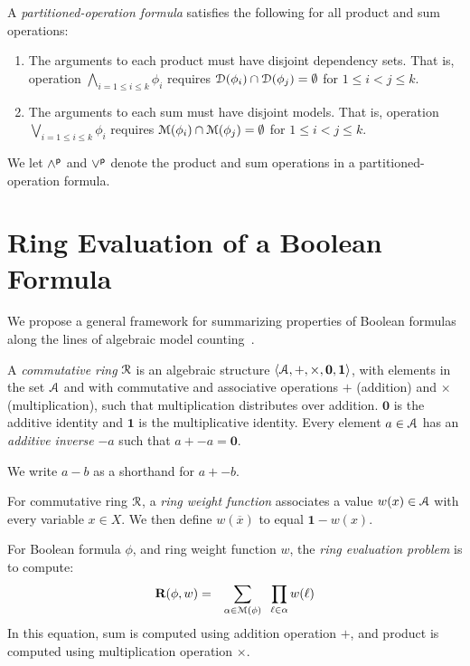 \documentclass[letterpaper,USenglish,cleveref, autoref, thm-restate]{lipics-v2021}
\newcommand{\pand}{\mathbin{\land^{\sf p}}}
\newcommand{\por}{\mathbin{\lor^{\sf p}}}
\newcommand{\obar}[1]{\overline{#1}}
\newcommand{\lit}{\ell}
\newcommand{\varset}{X}
\newcommand{\dependencyset}{{\cal D}}
\newcommand{\ring}{{\cal R}}
\newcommand{\dset}{{\cal A}}
\newcommand{\rep}{\textbf{R}}
\newcommand{\radd}{+}
\newcommand{\rmul}{\times}
\newcommand{\addident}{\textbf{0}}
\newcommand{\mulident}{\textbf{1}}
\newcommand{\modelset}{{\cal M}}
\begin{document}
\begin{definition}\label{def:partitioned-operation-formula}
  A {\em partitioned-operation formula}
 satisfies the following for all product and sum operations:
      \begin{enumerate}
      \item The arguments to each product must have disjoint dependency sets.  That is, operation
        $\bigwedge_{i=1 \leq i \leq k} \phi_i$ requires $\dependencyset(\phi_i) \cap \dependencyset(\phi_j) = \emptyset$ for $1 \leq i < j \leq k$.
      \item The arguments to each sum must have disjoint models.  That is, operation
        $\bigvee_{i=1 \leq i \leq k} \phi_i$ requires $\modelset(\phi_i) \cap \modelset(\phi_j) = \emptyset$ for $1 \leq i < j \leq k$.
      \end{enumerate}
\end{definition}
     We let $\pand$ and $\por$ denote the product and sum operations in a partitioned-operation formula.

  \section{Ring Evaluation of a Boolean Formula}

We propose a general framework for summarizing properties of Boolean
formulas along the lines of algebraic model counting~\cite{kimmig:jal:2017}.

\begin{definition}
  A {\em commutative ring} $\ring$ is an algebraic structure
  $\langle \dset, \radd, \rmul, \addident, \mulident \rangle$,
  with elements in the set $\dset$ and with commutative and
  associative operations $\radd$ (addition) and $\rmul$ (multiplication),
  such that multiplication distributes
  over addition.  $\addident$ is the additive identity and $\mulident$ is
  the multiplicative identity.  Every element $a \in \dset$ has an
  {\em additive inverse} $-a$ such that $a + -a = \addident$.
\label{def:ring}
\end{definition}
We write $a - b$ as a shorthand for $a + -b$.

\begin{definition}
\label{def:ring_evaluation}
  For commutative ring $\ring$, a {\em ring weight function} associates a value $w(x) \in \dset$ with
  every variable $x \in \varset$.  We then define $w(\obar{x})$ to equal $\mulident-w(x)$.

  For Boolean formula $\phi$, and ring weight function $w$, the {\em ring evaluation problem} is to compute:
  \begin{eqnarray}
    \rep(\phi, w) & = & \sum_{\alpha \in \modelset(\phi)} \;\; \prod_{\lit \in \alpha} w(\ell) \label{eqn:rep}
  \end{eqnarray}
  In this equation, sum \scalebox{0.8}{$\sum$} is computed using addition operation $\radd$, and product \scalebox{0.8}{$\prod$} is computed using multiplication operation $\rmul$.
\label{def:weight}
\end{definition}
\end{document}
